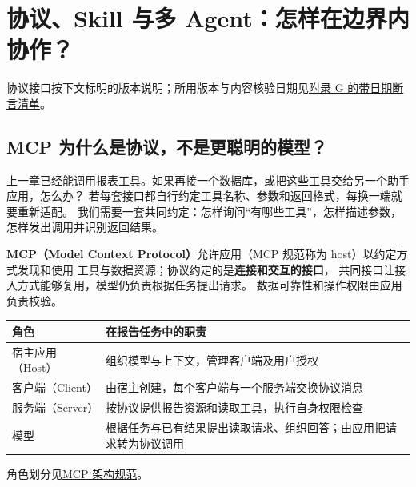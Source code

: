 \chapterrule
\section{协议、Skill 与多 Agent：怎样在边界内协作？}
\label{intro:protocols-and-multi-agent}
协议接口按下文标明的版本说明；所用版本与内容核验日期见\hyperref[app:dated-claims]{附录 G 的带日期断言清单}。

\subsection{MCP 为什么是协议，不是更聪明的模型？}
\label{concept:mcp}

上一章已经能调用报表工具。如果再接一个数据库，或把这些工具交给另一个助手应用，怎么办？
若每套接口都自行约定工具名称、参数和返回格式，每换一端就要重新适配。
我们需要一套共同约定：怎样询问“有哪些工具”，怎样描述参数，怎样发出调用并识别返回结果。

\textbf{MCP（Model Context Protocol）}允许应用（MCP 规范称为 host）以约定方式发现和使用
工具与数据资源；协议约定的是\textbf{连接和交互的接口}，
共同接口让接入方式能够复用，模型仍负责根据任务提出请求。
数据可靠性和操作权限由应用负责校验。

\begin{center}\small
{}
\begin{tabularx}{\linewidth}{@{}p{30mm}X@{}}\toprule
角色 & 在报告任务中的职责\\\midrule
宿主应用（Host） & 组织模型与上下文，管理客户端及用户授权\\
客户端（Client） & 由宿主创建，每个客户端与一个服务端交换协议消息\\
服务端（Server） & 按协议提供报告资源和读取工具，执行自身权限检查\\
模型 & 根据任务与已有结果提出读取请求、组织回答；由应用把请求转为协议调用\\\bottomrule
\end{tabularx}
\end{center}
角色划分见\href{https://modelcontextprotocol.io/specification/2026-07-28/architecture/index}{MCP 架构规范}。


